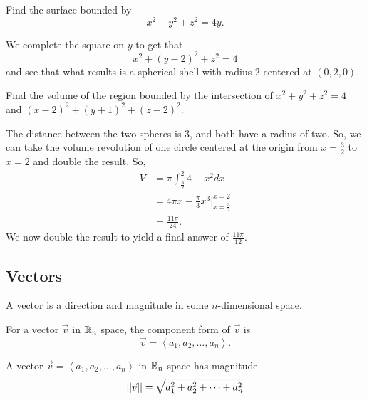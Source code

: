 \documentclass[12pt]{scrartcl}
\newcommand*{\magnitude}[1]{\abs{\abs{#1}}}
\begin{document}
\begin{example}
    Find the surface bounded by
    \[x^{2} + y^{2} + z^{2} = 4y.\]

    \begin{soln}
        We complete the square on $y$ to get that
        \[x^{2} + (y - 2)^{2} + z^{2} = 4\]
        and see that what results is a spherical shell with radius 2 centered at $(0, 2, 0)$.
    \end{soln}
\end{example}

\begin{example}
    Find the volume of the region bounded by the intersection of $x^{2} + y^{2} + z^{2} = 4$ and $(x - 2)^{2} + (y + 1)^{2} + (z - 2)^{2}$.

    \begin{soln}
        The distance between the two spheres is 3, and both have a radius of two. So, we can take the volume revolution of one circle centered at the origin from $x = \frac{3}{2}$ to $x = 2$ and double the result. So,
        \begin{align*}
            V &= \pi\int_{\frac{3}{2}}^{2} 4 - x^{2}dx \\
            &= 4\pi x - \frac{\pi}{3}x^{3} \biggr\rvert_{x = \frac{3}{2}}^{x = 2} \\
            &= \frac{11\pi}{24}.
        \end{align*}
        We now double the result to yield a final answer of $\frac{11\pi}{12}$.
    \end{soln}
\end{example}

\subsection{Vectors}

\begin{definition}[Vector]
    A vector is a direction and magnitude in some $n$-dimensional space.
\end{definition}

\begin{definition}
    For a vector $\vec{v}$ in $\mathbb R_{n}$ space, the component form of $\vec{v}$ is
    \[\vec{v} = \left<a_{1}, a_{2}, \dots, a_{n}\right>.\]
\end{definition}

\begin{definition}
    A vector $\vec{v} = \left<a_{1}, a_{2}, \dots, a_{n}\right>$ in $\mathbb R_{n}$ space has magnitude
    \[\magnitude{\vec{v}} = \sqrt{a_{1}^{2} + a_{2}^{2} + \cdots + a_{n}^{2}}\]
\end{definition}
\end{document}
